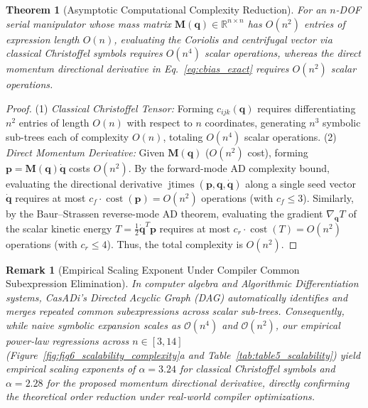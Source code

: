 \documentclass[fleqn,10pt]{article}
\newtheorem{theorem}{Theorem}
\newtheorem{remark}{Remark}
\begin{document}
	\begin{theorem}[Asymptotic Computational Complexity Reduction]
		\label{thm:complexity}
		For an $n$-DOF serial manipulator whose mass matrix $\bm{M}(\bm{q}) \in \mathbb{R}^{n \times n}$ has $O(n^2)$ entries of expression length $O(n)$, evaluating the Coriolis and centrifugal vector via classical Christoffel symbols requires $O(n^4)$ scalar operations, whereas the direct momentum directional derivative in Eq.~\eqref{eq:cbias_exact} requires $O(n^2)$ scalar operations.
	\end{theorem}
	\begin{proof}
		(1) \textit{Classical Christoffel Tensor:} Forming $c_{ijk}(\bm{q})$ requires differentiating $n^2$ entries of length $O(n)$ with respect to $n$ coordinates, generating $n^3$ symbolic sub-trees each of complexity $O(n)$, totaling $O(n^4)$ scalar operations.
		(2) \textit{Direct Momentum Derivative:} Given $\bm{M}(\bm{q})$ ($O(n^2)$ cost), forming $\bm{p} = \bm{M}(\bm{q})\dot{\bm{q}}$ costs $O(n^2)$. By the forward-mode AD complexity bound, evaluating the directional derivative $\operatorname{jtimes}(\bm{p}, \bm{q}, \dot{\bm{q}})$ along a single seed vector $\dot{\bm{q}}$ requires at most $c_f \cdot \operatorname{cost}(\bm{p}) = O(n^2)$ operations (with $c_f \le 3$). Similarly, by the Baur--Strassen reverse-mode AD theorem, evaluating the gradient $\nabla_{\bm{q}} T$ of the scalar kinetic energy $T = \frac{1}{2}\dot{\bm{q}}^T\bm{p}$ requires at most $c_r \cdot \operatorname{cost}(T) = O(n^2)$ operations (with $c_r \le 4$). Thus, the total complexity is $O(n^2)$.
	\end{proof}
	
	\begin{remark}[Empirical Scaling Exponent Under Compiler Common Subexpression Elimination]
		In computer algebra and Algorithmic Differentiation systems, CasADi's Directed Acyclic Graph (DAG) automatically identifies and merges repeated common subexpressions across scalar sub-trees. Consequently, while naive symbolic expansion scales as $\mathcal{O}(n^4)$ and $\mathcal{O}(n^2)$, our empirical power-law regressions across $n \in [3, 14]$ (Figure~\ref{fig:fig6_scalability_complexity}a and Table~\ref{tab:table5_scalability}) yield empirical scaling exponents of $\alpha = 3.24$ for classical Christoffel symbols and $\alpha = 2.28$ for the proposed momentum directional derivative, directly confirming the theoretical order reduction under real-world compiler optimizations.
	\end{remark}
	
\end{document}
